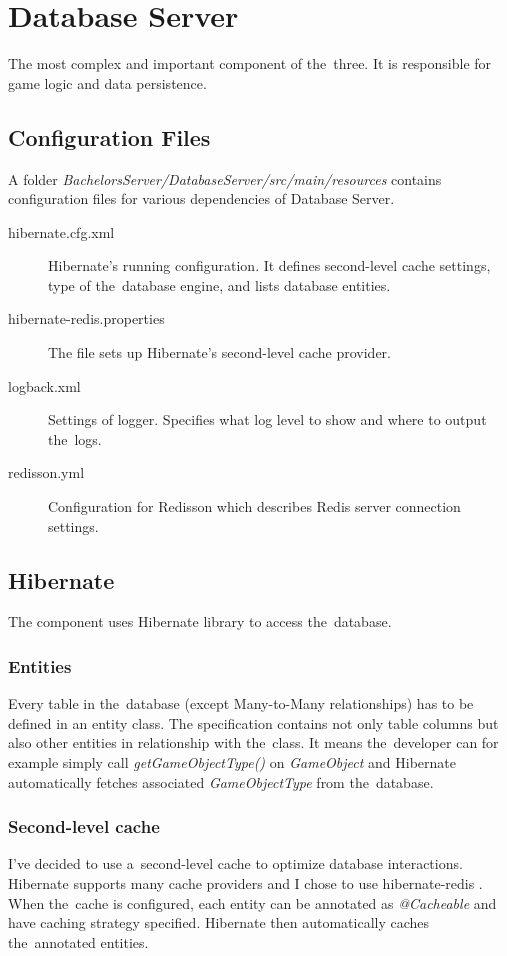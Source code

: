 \section{Database Server}
The most complex and important component of the~three. It is responsible for game logic and data persistence.

\subsection{Configuration Files}
A folder \textit{BachelorsServer/DatabaseServer/src/main/resources} contains configuration files for various dependencies of Database Server.
\begin{description}
	\item[hibernate.cfg.xml] Hibernate's running configuration. It defines second-level cache settings, type of the~database engine, and lists database entities.
	\item[hibernate-redis.properties] The file sets up Hibernate's second-level cache provider.
	\item[logback.xml] Settings of logger. Specifies what log level to show and where to output the~logs.
	\item[redisson.yml] Configuration for Redisson which describes Redis server connection settings. 
\end{description}

\subsection{Hibernate}
The component uses Hibernate library to access the~database.

\subsubsection*{Entities}
Every table in the~database (except Many-to-Many relationships) has to be defined in an entity class. The specification contains not only table columns but also other entities in relationship with the~class. It means the~developer can for example simply call \textit{getGameObjectType()} on \textit{GameObject} and Hibernate automatically fetches associated \textit{GameObjectType} from the~database.

\subsubsection*{Second-level cache}
I've decided to use a~second-level cache to optimize database interactions. Hibernate supports many cache providers and I chose to use hibernate-redis \cite{hibernateredis}. When the~cache is configured, each entity can be annotated as \textit{@Cacheable} and have caching strategy specified. Hibernate then automatically caches the~annotated entities.

